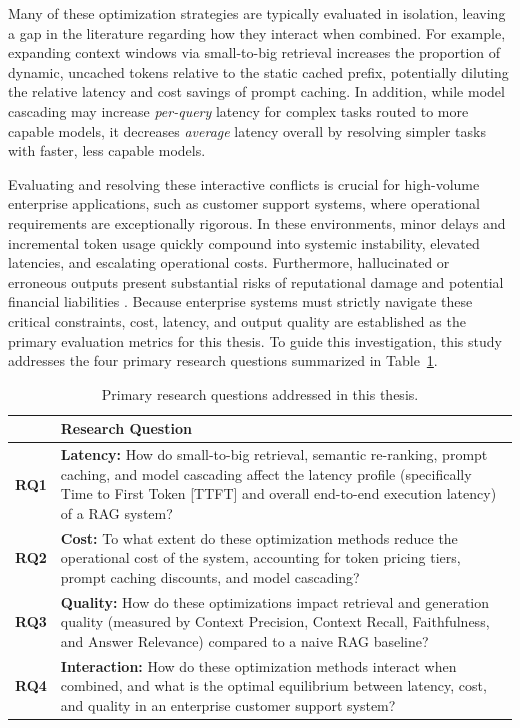 Many of these optimization strategies are typically evaluated in isolation, leaving a gap in the literature regarding how they interact when combined. For example, expanding context windows via small-to-big retrieval increases the proportion of dynamic, uncached tokens relative to the static cached prefix, potentially diluting the relative latency and cost savings of prompt caching. In addition, while model cascading may increase \textit{per-query} latency for complex tasks routed to more capable models, it decreases \textit{average} latency overall by resolving simpler tasks with faster, less capable models.

Evaluating and resolving these interactive conflicts is crucial for high-volume enterprise applications, such as customer support systems, where operational requirements are exceptionally rigorous. In these environments, minor delays and incremental token usage quickly compound into systemic instability, elevated latencies, and escalating operational costs. Furthermore, hallucinated or erroneous outputs present substantial risks of reputational damage and potential financial liabilities \citep{aba2024aircanada}. Because enterprise systems must strictly navigate these critical constraints, cost, latency, and output quality are established as the primary evaluation metrics for this thesis. To guide this investigation, this study addresses the four primary research questions summarized in Table~\ref{tab:research_questions}.

\begin{table}[htbp]
    \centering
    \caption[Primary research questions]{Primary research questions addressed in this thesis.}
    \label{tab:research_questions}
    \begin{tabularx}{\textwidth}{l X}
    \toprule
    \textbf{} & \textbf{Research Question} \\
    \midrule
    \textbf{RQ1} & \textbf{Latency:} How do small-to-big retrieval, semantic re-ranking, prompt caching, and model
  cascading affect the latency profile (specifically Time to First Token [TTFT] and overall end-to-end execution
  latency) of a RAG system? \\
    \addlinespace
    \textbf{RQ2} & \textbf{Cost:} To what extent do these optimization methods reduce the operational cost of the
  system, accounting for token pricing tiers, prompt caching discounts, and model cascading? \\
    \addlinespace
    \textbf{RQ3} & \textbf{Quality:} How do these optimizations impact retrieval and generation quality (measured by
  Context Precision, Context Recall, Faithfulness, and Answer Relevance) compared to a naive RAG baseline? \\
    \addlinespace
    \textbf{RQ4} & \textbf{Interaction:} How do these optimization methods interact when combined, and what is the
  optimal equilibrium between latency, cost, and quality in an enterprise customer support system? \\
    \bottomrule
    \end{tabularx}
\end{table}


